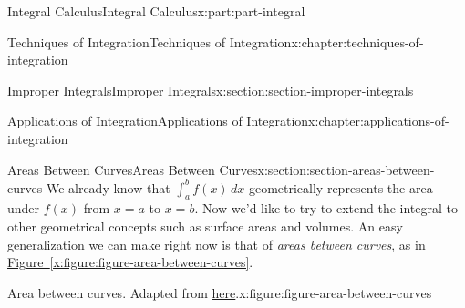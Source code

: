 \documentclass[twoside,10pt,]{tufte-book}
\newcommand{\xreffont}{\relax}
\numberwithin{equation}{part}
\begin{document}
\begin{partptx}{Integral Calculus}{}{Integral Calculus}{}{}{x:part:part-integral}
\begin{chapterptx}{Techniques of Integration}{}{Techniques of Integration}{}{}{x:chapter:techniques-of-integration}
\begin{sectionptx}{Improper Integrals}{}{Improper Integrals}{}{}{x:section:section-improper-integrals}
\end{sectionptx}
\end{chapterptx}
%
\typeout{************************************************}
\typeout{************************************************}
%
\begin{chapterptx}{Applications of Integration}{}{Applications of Integration}{}{}{x:chapter:applications-of-integration}
%
%
\typeout{************************************************}
\typeout{************************************************}
%
\begin{sectionptx}{Areas Between Curves}{}{Areas Between Curves}{}{}{x:section:section-areas-between-curves}
We already know that \(\int_{a}^{b}f(x)\,dx\) geometrically represents the area under \(f(x)\) from \(x = a\) to \(x = b\). Now we'd like to try to extend the integral to other geometrical concepts such as surface areas and volumes. An easy generalization we can make right now is that of \emph{areas between curves}, as in \hyperref[x:figure:figure-area-between-curves]{Figure~{\xreffont\ref{x:figure:figure-area-between-curves}}}.%
\begin{figureptx}{Area between curves. Adapted from \href{https://tex.stackexchange.com/questions/164773/graphics-area-between-curves}{here}\protect\footnotemark{}.}{x:figure:figure-area-between-curves}{}%
\begin{image}{0.125}{0.75}{0.125}%
\end{image}
\end{figureptx}
\end{sectionptx}
\end{chapterptx}
\end{partptx}
\end{document}
